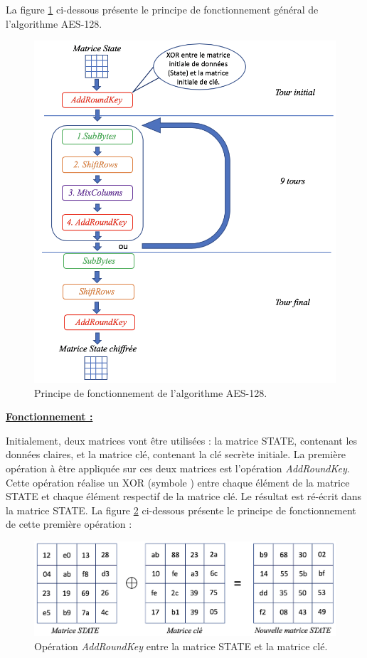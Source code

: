 \documentclass[oneside]{book}
\begin{document}
La figure \ref{fig:AES} ci-dessous présente le principe de fonctionnement général de l'algorithme AES-128.
\begin{figure}[htbp]
    \centering
    \includegraphics[scale=0.75]{image/AES}
    \caption{Principe de fonctionnement de l'algorithme AES-128.} 
    \label{fig:AES}
\end{figure}



\underline{\textbf{Fonctionnement :}} 

Initialement, deux matrices vont être utilisées : la matrice STATE, contenant les données claires, et la matrice clé, contenant la clé secrète initiale. La première opération à être appliquée sur ces deux matrices est l'opération \textit{AddRoundKey}. Cette opération réalise un XOR (symbole \oplus) entre chaque élément de la matrice STATE et chaque élément respectif de la matrice clé. Le résultat est ré-écrit dans la matrice STATE. La figure \ref{fig:XOR} ci-dessous présente le principe de fonctionnement de cette première opération :
\begin{figure}[htbp]
    \centering
    \includegraphics[scale=0.55]{image/XOR}
    \caption{Opération \textit{AddRoundKey} entre la matrice STATE et la matrice clé.}
    \label{fig:XOR}
\end{figure}
\end{document}
